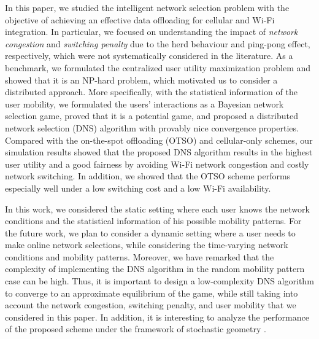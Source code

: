\documentclass[journal]{IEEEtran}
\begin{document}
  In this paper, we studied the intelligent network selection problem with the objective of achieving an effective data offloading for cellular and Wi-Fi integration. In particular, we focused on understanding the impact of \emph{network congestion} and \emph{switching penalty} due to the herd behaviour and ping-pong effect, respectively, which were not systematically considered in the literature.
	As a benchmark, we formulated the centralized user utility maximization problem and showed that it is an NP-hard problem, which motivated us to consider a distributed approach.
	More specifically, with the statistical information of the user mobility, we formulated the users' interactions as a Bayesian network selection game, proved that it is a potential game, and proposed a distributed network selection (DNS) algorithm with provably nice convergence properties.
	Compared with the on-the-spot offloading (OTSO) and cellular-only schemes, our simulation results showed that the proposed DNS algorithm results in the highest user utility and a good fairness by avoiding Wi-Fi network congestion and costly network switching.	
	 In addition, we showed that the OTSO scheme performs especially well under a low switching cost and a low Wi-Fi availability.
	
  In this work, we considered the static setting where each user knows the network conditions and the statistical information of his possible mobility patterns. %
	For the future work, we plan to consider a dynamic setting where a user needs to make online network selections, while considering the time-varying network conditions and mobility patterns. %
	Moreover, we have remarked that the complexity of implementing the DNS algorithm in the random mobility pattern case can be high. Thus, it is important to design a low-complexity DNS algorithm to converge to an approximate equilibrium of the game, while still taking into account the network congestion, switching penalty, and user mobility that we considered in this paper. 
	In addition, it is interesting to analyze the performance of the proposed scheme under the framework of stochastic geometry \cite{bao_sg15}.
	
\end{document}
